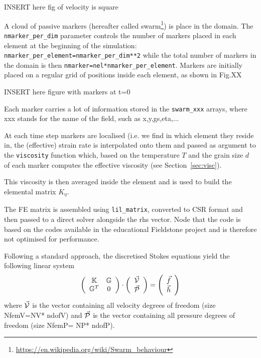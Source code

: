 \documentclass[a4paper]{article}
\newcommand{\K}{{\mathbb{K}}}
\newcommand{\G}{{\mathbb{G}}}
\begin{document}
\begin{center}
INSERT here fig of velocity is square
\end{center}

A cloud of passive markers (hereafter called swarm\footnote{\url{https://en.wikipedia.org/wiki/Swarm_behaviour}}) is 
place in the domain. 
The \lstinline{nmarker_per_dim} parameter controls the number of
markers placed in each element at the beginning of the simulation:
\lstinline{nmarker_per_element=nmarker_per_dim**2}
while the total number of markers in the domain is then 
\lstinline{nmarker=nel*nmarker_per_element}.
Markers are initially placed on a regular grid of positions inside each element, as shown in 
Fig.XX

\begin{center}
INSERT here figure with markers at t=0
\end{center}

Each marker carries a lot of information stored in the \lstinline{swarm_xxx}
arrays, where xxx stands for the name of the field, such as x,y,gs,eta,... 

At each time step markers are localised (i.e. we find in which element they reside
in, the (effective) strain rate is interpolated onto them and passed as 
argument to the \lstinline{viscosity} function which, based on the 
temperature $T$ and the grain size $d$ of each marker computes the 
effective viscosity (see Section~\ref{sec:visc}).

This viscosity is then averaged inside the element and is used to build
the elemental matrix $K_\eta$.

The FE matrix is assembled using \lstinline{lil_matrix},
converted to CSR format and then passed to a direct solver alongside the rhs vector.
Node that the code is based on the codes available in the educational Fieldstone project
and is therefore not optimised for performance.



Following a standard approach, the discretised Stokes equations yield
the following linear system
\[
\left(
\begin{array}{cc}
\K & \G \\
\G^T & 0 
\end{array}
\right)
\cdot
\left(
\begin{array}{c}
\vec{\cal V} \\ 
\vec{\cal P}
\end{array}
\right)
=
\left(
\begin{array}{c}
\vec{f} \\ 
\vec{h}
\end{array}
\right)
\]
where $\vec{\cal V}$ is the vector containing all velocity degrees of 
freedom (size { NfemV}={NV}*{ ndofV})
and $\vec{\cal P}$ is the vector containing all pressure degrees of freedom 
(size { NfemP}={ NP}*{ ndofP}).
\end{document}

